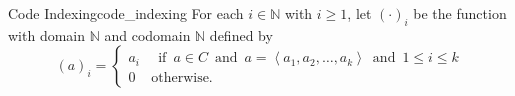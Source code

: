 \begin{definition}
{Code Indexing}{code_indexing}
For each \(i \in \mathbb{N}\) with \(i \geq 1\), let \((\cdot)_{i}\) be the
function with domain \(\mathbb{N}\) and codomain \(\mathbb{N}\) defined by
\[
(a)_{i} =
\begin{cases}
a_{i} & \enspace \text{if} \enspace  a \in C \enspace \text{and} \enspace   a = \left\langle a_{1}, a_{2}, \ldots,
a_{k}\right\rangle \enspace \text{and} \enspace   1 \leq i \leq k \\
 0 & \text {otherwise.}
\end{cases}
\]
\end{definition}
